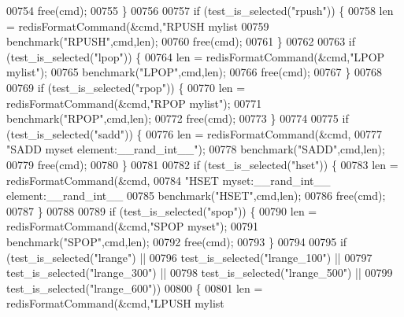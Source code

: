 \begin{DoxyCode}
{{{{{{{{{{{{{{{{{{{{{{{00754             free(cmd);
00755         \}
00756 
00757         \textcolor{keywordflow}{if} (test\_is\_selected(\textcolor{stringliteral}{"rpush"})) \{
00758             len = redisFormatCommand(&cmd,\textcolor{stringliteral}{"RPUSH mylist %
00759             benchmark(\textcolor{stringliteral}{"RPUSH"},cmd,len);
00760             free(cmd);
00761         \}
00762 
00763         \textcolor{keywordflow}{if} (test\_is\_selected(\textcolor{stringliteral}{"lpop"})) \{
00764             len = redisFormatCommand(&cmd,\textcolor{stringliteral}{"LPOP mylist"});
00765             benchmark(\textcolor{stringliteral}{"LPOP"},cmd,len);
00766             free(cmd);
00767         \}
00768 
00769         \textcolor{keywordflow}{if} (test\_is\_selected(\textcolor{stringliteral}{"rpop"})) \{
00770             len = redisFormatCommand(&cmd,\textcolor{stringliteral}{"RPOP mylist"});
00771             benchmark(\textcolor{stringliteral}{"RPOP"},cmd,len);
00772             free(cmd);
00773         \}
00774 
00775         \textcolor{keywordflow}{if} (test\_is\_selected(\textcolor{stringliteral}{"sadd"})) \{
00776             len = redisFormatCommand(&cmd,
00777                 \textcolor{stringliteral}{"SADD myset element:\_\_rand\_int\_\_"});
00778             benchmark(\textcolor{stringliteral}{"SADD"},cmd,len);
00779             free(cmd);
00780         \}
00781 
00782         \textcolor{keywordflow}{if} (test\_is\_selected(\textcolor{stringliteral}{"hset"})) \{
00783             len = redisFormatCommand(&cmd,
00784                 \textcolor{stringliteral}{"HSET myset:\_\_rand\_int\_\_ element:\_\_rand\_int\_\_ %
00785             benchmark(\textcolor{stringliteral}{"HSET"},cmd,len);
00786             free(cmd);
00787         \}
00788 
00789         \textcolor{keywordflow}{if} (test\_is\_selected(\textcolor{stringliteral}{"spop"})) \{
00790             len = redisFormatCommand(&cmd,\textcolor{stringliteral}{"SPOP myset"});
00791             benchmark(\textcolor{stringliteral}{"SPOP"},cmd,len);
00792             free(cmd);
00793         \}
00794 
00795         \textcolor{keywordflow}{if} (test\_is\_selected(\textcolor{stringliteral}{"lrange"}) ||
00796             test\_is\_selected(\textcolor{stringliteral}{"lrange\_100"}) ||
00797             test\_is\_selected(\textcolor{stringliteral}{"lrange\_300"}) ||
00798             test\_is\_selected(\textcolor{stringliteral}{"lrange\_500"}) ||
00799             test\_is\_selected(\textcolor{stringliteral}{"lrange\_600"}))
00800         \{
00801             len = redisFormatCommand(&cmd,\textcolor{stringliteral}{"LPUSH mylist %
}}}}}}}}}}}}}}}}}}}}}}}}}}
\end{DoxyCode}

